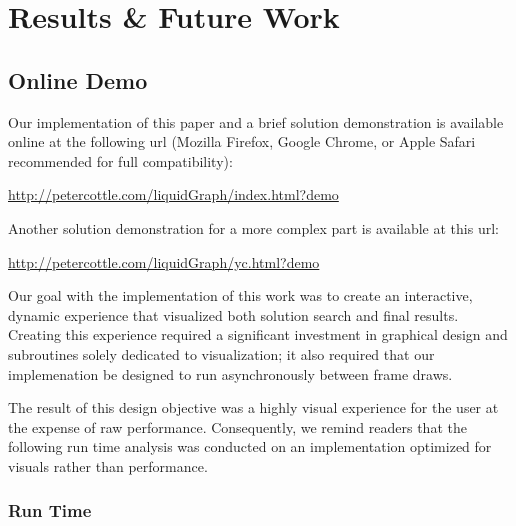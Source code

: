           \chapter{Results \& Future Work}\label{results}


\section{Online Demo}

Our implementation of this paper and a brief solution demonstration is available online at the following url (Mozilla Firefox, Google Chrome, or Apple Safari recommended for full compatibility):

\vspace{0.2in}

\begin{centering}
\url{http://petercottle.com/liquidGraph/index.html?demo}
\end{centering}

\vspace{0.2in}

Another solution demonstration for a more complex part is available at this url:

\vspace{0.2in}

\begin{centering}
\url{http://petercottle.com/liquidGraph/yc.html?demo}
\end{centering}

\vspace{0.2in}


\newpage



Our goal with the implementation of this work was to create an interactive, dynamic experience that visualized both solution search and final results. Creating this experience required a significant investment in graphical design and subroutines solely dedicated to visualization; it also required that our implemenation be designed to run asynchronously between frame draws.

The result of this design objective was a highly visual experience for the user at the expense of raw performance. Consequently, we remind readers that the following run time analysis was conducted on an implementation optimized for visuals rather than performance.

  \subsection{Run Time}

